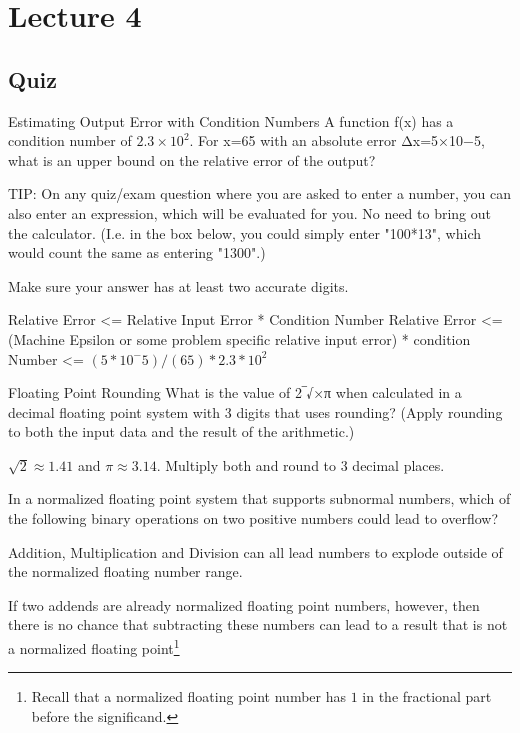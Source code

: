 \documentclass[../main.tex]{subfiles}
\begin{document}
\section{Lecture 4}

\subsection{Quiz}
Estimating Output Error with Condition Numbers
A function f(x) has a condition number of $2.3×10^2$. For x=65 with an absolute error Δx=5×10−5, what is an upper bound on the relative error of the output?

TIP: On any quiz/exam question where you are asked to enter a number, you can also enter an expression, which will be evaluated for you. No need to bring out the calculator. (I.e. in the box below, you could simply enter "100*13", which would count the same as entering "1300".)

Make sure your answer has at least two accurate digits.

\begin{solution}
    Relative Error <= Relative Input Error * Condition Number
    Relative Error <= (Machine Epsilon or some problem specific relative input error) * condition Number
    <= $(5 * 10^-5)/(65) * 2.3 * 10^2$
\end{solution}


Floating Point Rounding
What is the value of 2‾√×π when calculated in a decimal floating point system with 3 digits that uses rounding? (Apply rounding to both the input data and the result of the arithmetic.)

\begin{solution}
    $\sqrt{2} \approx 1.41$ and $\pi \approx 3.14$. Multiply both and round to $3$ decimal places.
\end{solution}

In a normalized floating point system that supports subnormal numbers, which of the following binary operations on two positive numbers could lead to overflow?

\begin{solution}
    Addition, Multiplication and Division can all lead numbers to explode outside of the normalized floating number range.

    If two addends are already normalized floating point numbers, however, then there is no chance that subtracting these numbers can lead to a result that is not a normalized floating point\footnote{Recall that a normalized floating point number has $1$ in the fractional part before the significand.}
\end{solution}
\end{document}
